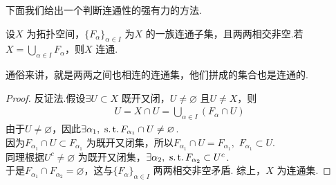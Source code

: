 \newpage
	下面我们给出一个判断连通性的强有力的方法.
	\begin{proposition}\label{prop 2.3.5}
		设$X$ 为拓扑空间，$\{ F_\alpha \}_{\alpha \in I}$ 为$X$ 的一族连通子集，且两两相交非空.若$X = \underset{\alpha \in I}{\bigcup}{F_\alpha}$，则$X$ 连通.
		\begin{rmk}
			通俗来讲，就是两两之间也相连的连通集，他们拼成的集合也是连通的.
		\end{rmk}
	
		\begin{proof}
			反证法.假设$\exists U \subset X$ 既开又闭，$U \neq \varnothing$ 且$U \neq X$，则
			\begin{align}
				U = X \cap U = \bigcup_{\alpha \in I}{\left( F_\alpha \cap U \right)}
			\end{align}
			由于$U \neq \varnothing$，因此$\exists \alpha_1 , \,\, \operatorname{s.t.} F_{\alpha_1} \cap U \neq \varnothing$.\\
			因为$F_{\alpha_1} \cap U \subset F_{\alpha_1}$ 为既开又闭集，所以$F_{\alpha_1} \cap U = F_{\alpha_1} , \,\, F_{\alpha_1} \subset U$. \\
			同理根据$U^c \neq \varnothing$ 为既开又闭集，$\exists \alpha_2 , \,\, \operatorname{s.t.} F_{\alpha_2} \subset U^c$.\\
			于是$F_{\alpha_1} \cap F_{\alpha_2} = \varnothing$，这与$\{ F_\alpha \}_{\alpha \in I}$ 两两相交非空矛盾. 综上，$X$ 为连通集.
		\end{proof}
	\end{proposition}

